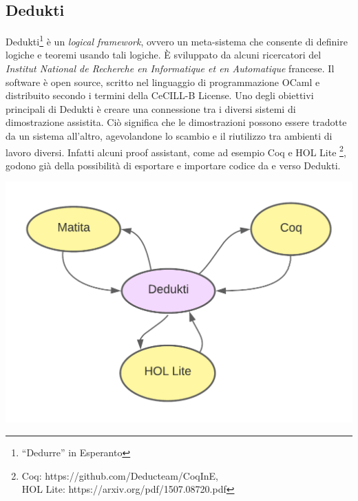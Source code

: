 \documentclass[12pt,a4paper]{mimosis}
\begin{document}
\subsection{Dedukti}
Dedukti\footnote{``Dedurre'' in Esperanto} è un \textit{logical framework}, ovvero
un meta-sistema che consente di definire logiche e teoremi usando tali logiche.
È sviluppato da alcuni ricercatori del \textit{Institut National de Recherche
en Informatique et en Automatique} francese. Il software è open source, scritto
nel linguaggio di programmazione OCaml e distribuito secondo i termini della
CeCILL-B License. Uno degli obiettivi principali di Dedukti è creare
una connessione tra i diversi sistemi di dimostrazione assistita. Ciò significa
che le dimostrazioni possono essere tradotte da un sistema all'altro, agevolandone
lo scambio e il riutilizzo tra ambienti di lavoro diversi.
Infatti alcuni proof assistant, come ad esempio Coq e HOL Lite \footnote{Coq: https://github.com/Deducteam/CoqInE,\\ HOL Lite: https://arxiv.org/pdf/1507.08720.pdf},
godono già della possibilità di esportare e importare codice da e verso
Dedukti.
\begin{center}
\includegraphics[scale=0.20]{schema1.png}
\end{center}
\end{document}
